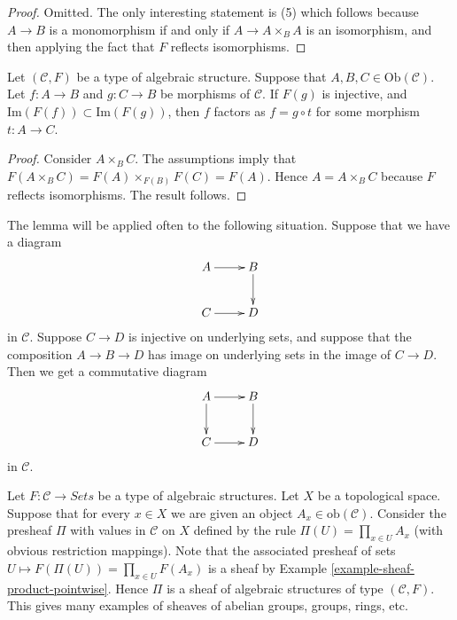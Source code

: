 \begin{proof}
Omitted. The only interesting statement is (5) which
follows because $A \to B$ is a monomorphism if and only if
$A \to A\times_BA$ is an isomorphism, and then applying
the fact that $F$ reflects isomorphisms.
\end{proof}

\begin{lemma}
\label{lemma-image-contained-in}
Let $(\mathcal{C}, F)$ be a type of algebraic structure.
Suppose that $A, B, C \in \text{Ob}(\mathcal{C})$.
Let $f : A \to B$ and $g : C \to B$ be morphisms of
$\mathcal{C}$. If $F(g)$ is injective, and
$\text{Im}(F(f)) \subset \text{Im}(F(g))$, then 
$f$ factors as $f = g \circ t$ for some morphism
$t : A \to C$.
\end{lemma}

\begin{proof}
Consider $A \times_B C$. The assumptions imply that
$F(A \times_B C) = F(A) \times_{F(B)} F(C) = F(A)$.
Hence $A = A\times_B C$ because $F$ reflects isomorphisms.
The result follows.
\end{proof}

\begin{example}
\label{example-application-lemma-image-contained-in}
The lemma will be applied often to the following situation.
Suppose that we have a diagram
$$
\xymatrix{
A \ar[r] & B \ar[d] \\
C \ar[r] & D 
}
$$
in $\mathcal{C}$. Suppose $C \to D$ is injective on underlying
sets, and suppose that the composition $A \to B \to D$ has
image on underlying sets in the image of $C \to D$. 
Then we get a commutative diagram
$$
\xymatrix{
A \ar[r] \ar[d] & B \ar[d] \\
C \ar[r] & D 
}
$$
in $\mathcal{C}$.
\end{example}

\begin{example}
\label{example-sheaf-product-pointwise-algebraic-structure}
Let $F : \mathcal{C} \to \textit{Sets}$ be a
type of algebraic structures.
Let $X$ be a topological space. Suppose that
for every $x \in X$ we are given an object
$A_x \in \text{ob}(\mathcal{C})$. Consider the presheaf
$\Pi$ with values in $\mathcal{C}$ on $X$ defined by the rule
$\Pi(U) = \prod_{x \in U} A_x$ (with obvious restriction
mappings). Note that the associated presheaf of sets
$U \mapsto F(\Pi(U)) = \prod_{x \in U} F(A_x)$ is a sheaf
by Example \ref{example-sheaf-product-pointwise}.
Hence $\Pi$ is a sheaf of algebraic structures
of type $(\mathcal{C} , F)$. This gives many examples
of sheaves of abelian groups, groups, rings, etc.
\end{example}













